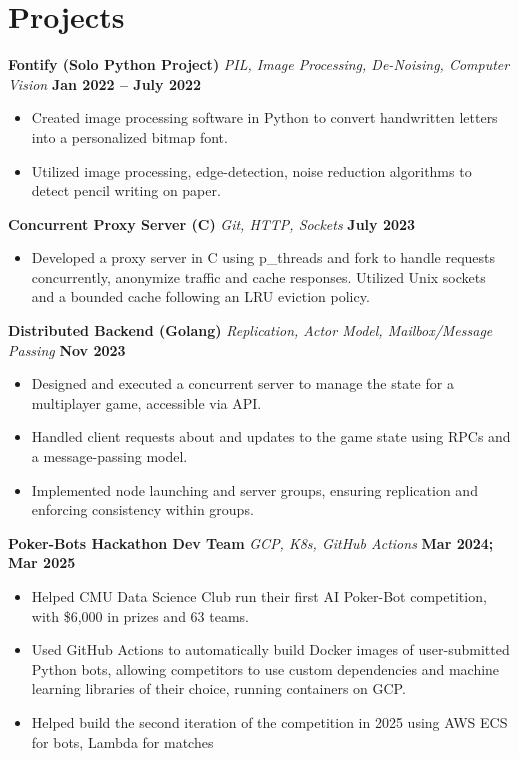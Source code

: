 \documentclass[fontsize=12pt]{scrartcl}
\begin{document}
\vspace{-12pt} %
\section{Projects}
\textbf{Fontify (Solo Python Project)} {\small\textit{PIL, Image Processing, De-Noising, Computer Vision}} \hfill \textbf{Jan 2022 -- July 2022}
\begin{itemize}
    \item Created image processing software in Python to convert handwritten letters into a personalized bitmap font.
    \item Utilized image processing, edge-detection, noise reduction algorithms to detect pencil writing on paper.
\end{itemize}

\textbf{Concurrent Proxy Server (C)} {\small\textit{Git, HTTP, Sockets}} \hfill \textbf{July 2023}
\begin{itemize}
    \item Developed a proxy server in C using p\_threads and fork to handle requests concurrently, anonymize traffic and cache responses. Utilized Unix sockets and a bounded cache following an LRU eviction policy.
\end{itemize}

\textbf{Distributed Backend (Golang)} {\small\textit{Replication, Actor Model, Mailbox/Message Passing}} \hfill \textbf{Nov 2023}
\begin{itemize}
    \item Designed and executed a concurrent server to manage the state for a multiplayer game, accessible via API\@.
    \item Handled client requests about and updates to the game state using RPCs and a message-passing model.
    \item Implemented node launching and server groups, ensuring replication and enforcing consistency within groups.
\end{itemize}

\textbf{Poker-Bots Hackathon Dev Team} {\small\textit{GCP, K8s, GitHub Actions}} \hfill \textbf{Mar 2024; Mar 2025}
\begin{itemize}
    \item Helped CMU Data Science Club run their first AI Poker-Bot competition, with \$6,000 in prizes and 63 teams.
    \item Used GitHub Actions to automatically build Docker images of user-submitted Python bots, allowing competitors to use custom dependencies and machine learning libraries of their choice, running containers on GCP\@.
    \item Helped build the second iteration of the competition in 2025 using AWS ECS for bots, Lambda for matches
\end{itemize}
\end{document}

